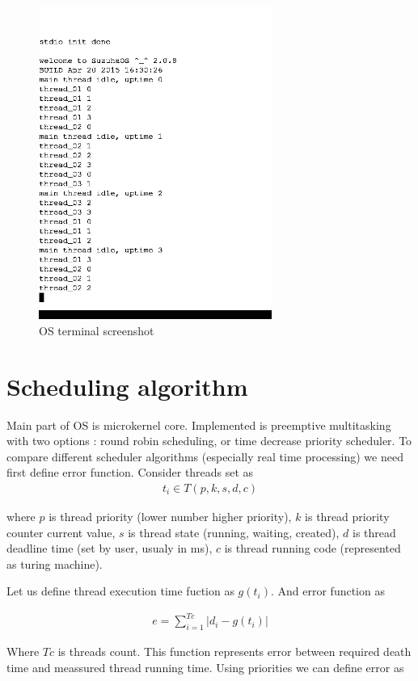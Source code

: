\documentclass[conference]{IEEEtran}
\begin{document}
\begin{figure}[!t]
\centering
\includegraphics[width=3.0in]{threads.png}
\caption{OS terminal screenshot}
\label{fig_os_terminal}
\end{figure}

\section{Scheduling algorithm}

Main part of OS is microkernel core. Implemented is preemptive multitasking with two options : round robin scheduling, or time decrease
priority scheduler. To compare different scheduler algorithms (especially real time processing) we need first define error function. Consider threads set as
\begin{align}
\label{thread}
t_i \in T(p, k, s, d, c)
\end{align}

where
$p$ is thread priority (lower number higher priority),
$k$ is thread priority counter current value,
$s$ is thread state (running, waiting, created),
$d$ is thread deadline time (set by user, usualy in ms),
$c$ is thread running code (represented as turing machine).

Let us define thread execution time fuction as $g(t_i)$. And error function as 

\begin{align}
e = \sum_{i=1}^{Tc} |d_i - g(t_i)|
\end{align}

Where $Tc$ is threads count. This function represents error between required death time and meassured thread running time.
Using priorities we can define error as
\end{document}
